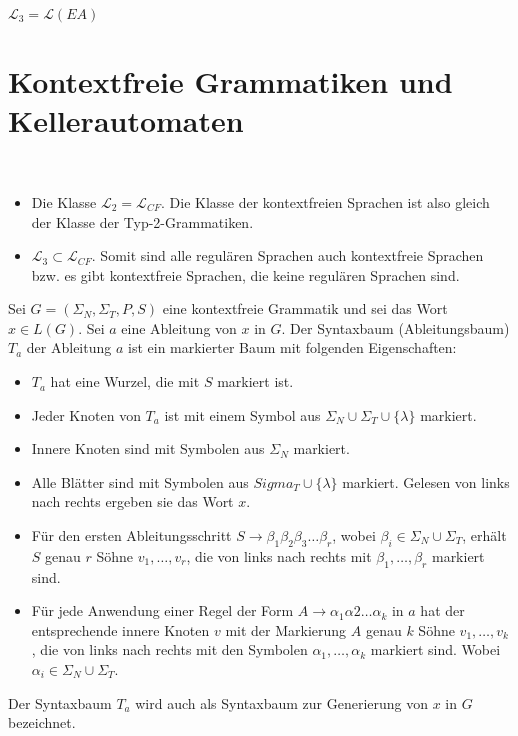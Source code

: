 \begin{satz}
$\mathcal{L}_3 = \mathcal{L}(EA)$
\end{satz}

\section{Kontextfreie Grammatiken und Kellerautomaten}
\begin{remark}\ 
\begin{itemize}
  \item Die Klasse \(\mathcal{L}_2 = \mathcal{L}_{CF}\). Die Klasse der kontextfreien Sprachen ist also gleich der Klasse der Typ-2-Grammatiken.
  \item \(\mathcal{L}_3 \subset \mathcal{L}_{CF}\). Somit sind alle regulären Sprachen auch kontextfreie Sprachen bzw. es gibt kontextfreie Sprachen, die keine regulären Sprachen sind.\\
\end{itemize}
\end{remark}

\begin{definition}
Sei \(G = (\Sigma_N, \Sigma_T, P, S)\) eine kontextfreie Grammatik und sei das Wort \(x \in L(G)\). Sei \(a\) eine Ableitung von \(x\) in \(G\). Der Syntaxbaum (Ableitungsbaum) \(T_a\) der Ableitung \(a\) ist ein markierter Baum mit folgenden Eigenschaften:
\begin{itemize}
  \item \(T_a\) hat eine Wurzel, die mit \(S\) markiert ist.
  \item Jeder Knoten von \(T_a\) ist mit einem Symbol aus \(\Sigma_N \cup \Sigma_T \cup \{\lambda\}\) markiert.
  \item Innere Knoten sind mit Symbolen aus \(\Sigma_N\) markiert.
  \item Alle Blätter sind mit Symbolen aus \(Sigma_T \cup \{\lambda\}\) markiert. Gelesen von links nach rechts ergeben sie das Wort \(x\).
  \item Für den ersten Ableitungsschritt \(S \to \beta_1 \beta_2 \beta_3 \ldots \beta_r\), wobei \(\beta_i \in \Sigma_N \cup \Sigma_T\), erhält \(S\) genau \(r\) Söhne \(v_1, \ldots, v_r\), die von links nach rechts mit \(\beta_1, \ldots, \beta_r\) markiert sind.
  \item Für jede Anwendung einer Regel der Form \(A \to \alpha_1 \alpha2 \ldots \alpha_k\) in \(a\) hat der entsprechende innere Knoten \(v\) mit der Markierung \(A\) genau \(k\) Söhne \(v_1, \ldots, v_k\), die von links nach rechts mit den Symbolen \(\alpha_1, \ldots, \alpha_k\) markiert sind. Wobei \(\alpha_i \in \Sigma_N \cup \Sigma_T\).
\end{itemize}

Der Syntaxbaum \(T_a\) wird auch als Syntaxbaum zur Generierung von \(x\) in \(G\) bezeichnet.\\
\end{definition}

